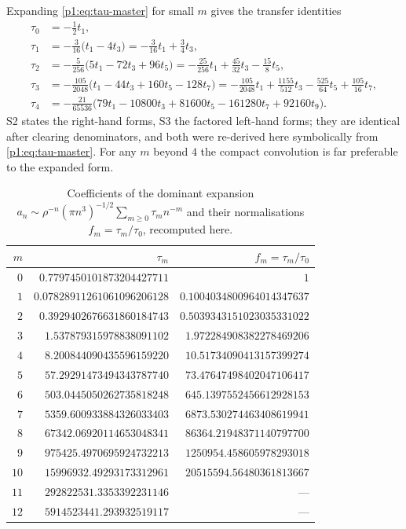 \documentclass[11pt,a4paper,oneside]{book}
\theoremstyle{plain}
\theoremstyle{definition}
\theoremstyle{remark}
\begin{document}
Expanding \cref{p1:eq:tau-master} for small $m$ gives the transfer identities
\begin{equation}
\begin{aligned}
 \tau_0&=-\tfrac12t_1,\\
 \tau_1&=-\tfrac3{16}\bigl(t_1-4t_3\bigr)
 =-\tfrac3{16}t_1+\tfrac34t_3,\\
 \tau_2&=-\tfrac5{256}\bigl(5t_1-72t_3+96t_5\bigr)
 =-\tfrac{25}{256}t_1+\tfrac{45}{32}t_3-\tfrac{15}8t_5,\\
 \tau_3&=-\tfrac{105}{2048}\bigl(t_1-44t_3+160t_5-128t_7\bigr)
 =-\tfrac{105}{2048}t_1+\tfrac{1155}{512}t_3-\tfrac{525}{64}t_5
 +\tfrac{105}{16}t_7,\\
 \tau_4&=-\tfrac{21}{65536}
 \bigl(79t_1-10800t_3+81600t_5-161280t_7+92160t_9\bigr).
\end{aligned}
\label{p1:eq:tau-expanded}
\end{equation}
\textsf{S2} states the right-hand forms, \textsf{S3} the factored left-hand forms; they are
identical after clearing denominators, and both were re-derived here symbolically from
\cref{p1:eq:tau-master}.  For any $m$ beyond $4$ the compact convolution is far preferable to
the expanded form.

\begin{table}[htbp]
\centering
\caption{Coefficients of the dominant expansion
$a_n\sim\rho^{-n}(\pi n^{3})^{-1/2}\sum_{m\ge0}\tau_mn^{-m}$ and their
normalisations $f_m=\tau_m/\tau_0$, recomputed here.}
\label{p1:tab:tau}
\small
\setlength{\tabcolsep}{6pt}
\begin{tabular}{r@{\quad}r@{\qquad}r}
\toprule
$m$ & $\tau_m$ & $f_m=\tau_m/\tau_0$\\
\midrule
$0$ & $0.7797450101873204427711$ & $1$\\
$1$ & $0.07828911261061096206128$ & $0.1004034800964014347637$\\
$2$ & $0.3929402676631860184743$ & $0.5039343151023035331022$\\
$3$ & $1.537879315978838091102$ & $1.972284908382278469206$\\
$4$ & $8.200844090435596159220$ & $10.51734090413157399274$\\
$5$ & $57.29291473494343787740$ & $73.47647498402047106417$\\
$6$ & $503.0445050262735818248$ & $645.1397552456612928153$\\
$7$ & $5359.600933884326033403$ & $6873.530274463408619941$\\
$8$ & $67342.06920114653048341$ & $86364.21948371140797700$\\
$9$ & $975425.4970695924732213$ & $1250954.458605978293018$\\
$10$ & $15996932.49293173312961$ & $20515594.56480361813667$\\
$11$ & $292822531.3353392231146$ & ---\\
$12$ & $5914523441.293932519117$ & ---\\
\bottomrule
\end{tabular}
\end{table}
\end{document}
